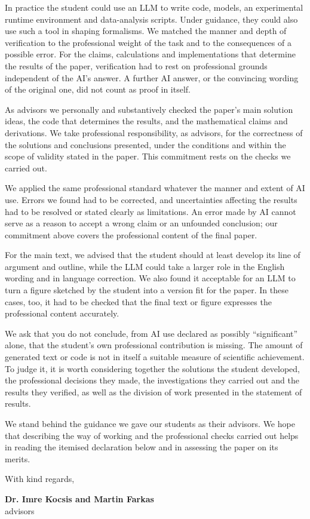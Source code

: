 In practice the student could use an LLM to write code, models, an experimental runtime environment and data-analysis scripts. Under guidance, they could also use such a tool in shaping formalisms. We matched the manner and depth of verification to the professional weight of the task and to the consequences of a possible error. For the claims, calculations and implementations that determine the results of the paper, verification had to rest on professional grounds independent of the AI's answer. A further AI answer, or the convincing wording of the original one, did not count as proof in itself.

As advisors we personally and substantively checked the paper's main solution ideas, the code that determines the results, and the mathematical claims and derivations. We take professional responsibility, as advisors, for the correctness of the solutions and conclusions presented, under the conditions and within the scope of validity stated in the paper. This commitment rests on the checks we carried out.

We applied the same professional standard whatever the manner and extent of AI use. Errors we found had to be corrected, and uncertainties affecting the results had to be resolved or stated clearly as limitations. An error made by AI cannot serve as a reason to accept a wrong claim or an unfounded conclusion; our commitment above covers the professional content of the final paper.

For the main text, we advised that the student should at least develop its line of argument and outline, while the LLM could take a larger role in the English wording and in language correction. We also found it acceptable for an LLM to turn a figure sketched by the student into a version fit for the paper. In these cases, too, it had to be checked that the final text or figure expresses the professional content accurately.

We ask that you do not conclude, from AI use declared as possibly \enquote{significant} alone, that the student's own professional contribution is missing. The amount of generated text or code is not in itself a suitable measure of scientific achievement. To judge it, it is worth considering together the solutions the student developed, the professional decisions they made, the investigations they carried out and the results they verified, as well as the division of work presented in the statement of results.

We stand behind the guidance we gave our students as their advisors. We hope that describing the way of working and the professional checks carried out helps in reading the itemised declaration below and in assessing the paper on its merits.

\medskip
\noindent With kind regards,

\noindent\textbf{Dr. Imre Kocsis and Martin Farkas}\\
advisors
\par
